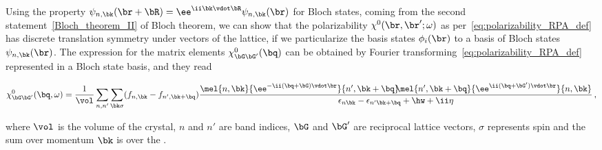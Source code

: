 Using the property $\psi_{n, \bk}(\br + \bR) = \ee^{\ii \bk \vdot \bR} \psi_{n, \bk}(\br)$ for Bloch states, coming from the second statement~\ref{Bloch_theorem_II} of Bloch theorem, we can show that the polarizability $\chi^0(\br,\br';\omega)$ as per~\eqref{eq:polarizability_RPA_def} has discrete translation symmetry under vectors of the lattice, if we particularize the basis states $\phi_i(\br)$ to a basis of Bloch states $\psi_{n, \bk}(\br)$.
The expression for the matrix elements $\chi^0_{\bG \bG'}(\bq)$ can be obtained by Fourier transforming~\eqref{eq:polarizability_RPA_def} represented in a Bloch state basis, and they read


\vspace{-0.3cm}
\begin{equation}
    \label{eq:polarizability_momentum_frequency}
    \chi^0_{\bG \bG'} (\bq,\omega) = \frac{1}{\vol} \sum_{n,n'} \sum_{\bk \sigma} (f_{n,\bk} - f_{n',\bk + \bq}) \frac{\mel{n,\bk}{\ee^{-\ii(\bq + \bG) \vdot \br}}{n',\bk + \bq} \! \! \mel{n',\bk + \bq}{\ee^{\ii(\bq + \bG') \vdot \br}}{n,\bk}}{\epsilon_{n \bk} - \epsilon_{n'\bk + \bq} + \hw + \ii \eta}\,,
\end{equation}

\noindent where $\vol$ is the volume of the crystal, $n$ and $n'$ are band indices, $\bG$ and $\bG'$ are reciprocal lattice vectors, $\sigma$ represents spin and the sum over momentum $\bk$ is over the \bz.

